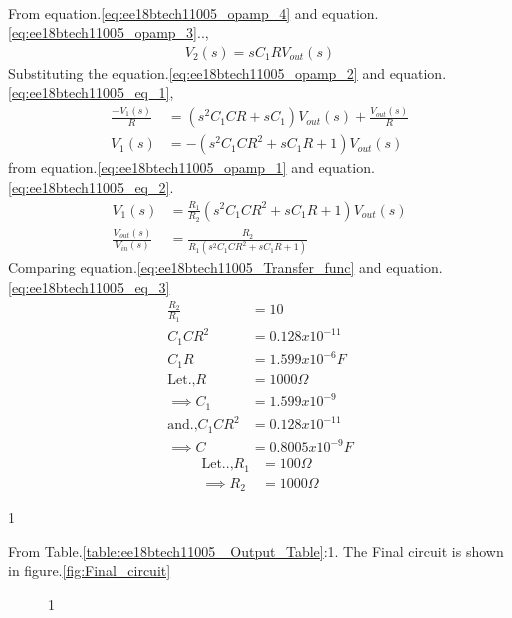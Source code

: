\begin{enumerate}[label=\arabic*.,ref=\theenumi]
\begin{align}
\end{align}
From equation.\ref{eq:ee18btech11005_opamp_4} and equation. \ref{eq:ee18btech11005_opamp_3}..,
\begin{align}
    V_2(s) = sC_1RV_{out}(s) \label{eq:ee18btech11005_eq_1}
\end{align}
Substituting the equation.\ref{eq:ee18btech11005_opamp_2} and equation.\ref{eq:ee18btech11005_eq_1},
\begin{align}
    \frac{-V_1(s)}{R} &= (s^2C_1CR + sC_1)V_{out}(s) +\frac{V_{out}(s)}{R}\\
    V_1(s) &= -(s^2C_1CR^2+sC_1R+1)V_{out}(s)\label{eq:ee18btech11005_eq_2}
\end{align}
from equation.\ref{eq:ee18btech11005_opamp_1} and equation.\ref{eq:ee18btech11005_eq_2}.
\begin{align}
     V_1(s) &= \frac{R_1}{R_2}(s^2C_1CR^2+sC_1R+1)V_{out}(s)\\
    \frac{V_{out}(s)}{V_{in}(s)} &= \frac{R_2}{R_1(s^2C_1CR^2+sC_1R+1)} \label{eq:ee18btech11005_eq_3}
\end{align}
Comparing equation.\ref{eq:ee18btech11005_Transfer_func} and equation.\ref{eq:ee18btech11005_eq_3}
\begin{align}
    \frac{R_2}{R_1} &= 10 \\
    C_1CR^2 &= 0.128x10^{-11} \\
    C_1R &= 1.599x10^{-6} F\\
\text{Let.,} R &= 1000 \Omega\\
\implies C_1 &= 1.599x10^{-9} \\
 \text{and.,} C_1CR^2 &= 0.128x10^{-11} \\
 \implies C &= 0.8005x10^{-9} F
\end{align}
\begin{align}
\text{Let..,} R_1 &= 100\Omega\\
\implies R_2 &= 1000\Omega
\end{align}
\begin{table}[!ht]
\centering

\caption{1}
\label{table:ee18btech11005_ Output_Table}
\end{table}
From Table.\ref{table:ee18btech11005_ Output_Table}:1. The Final circuit is shown in figure.\ref{fig:Final_circuit}
\begin{figure}[!hbt]
	\begin{center}
			\resizebox{\columnwidth}{!}{}
	\end{center}
\caption{1}

\end{figure}
\end{enumerate}
